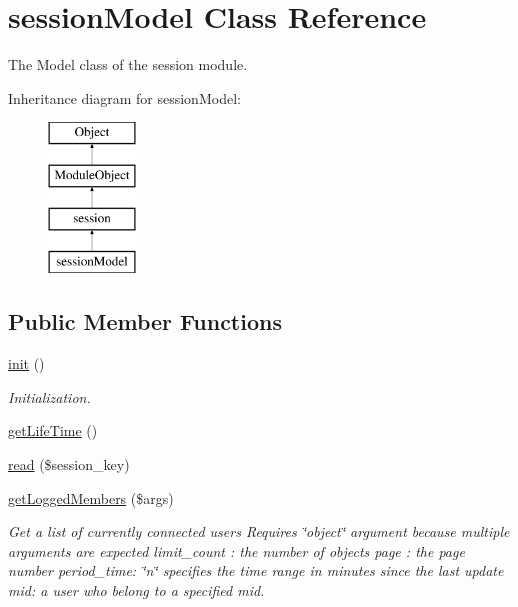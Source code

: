 \hypertarget{classsessionModel}{}\section{session\+Model Class Reference}
\label{classsessionModel}


The Model class of the session module.  


Inheritance diagram for session\+Model\+:\begin{figure}[H]
\begin{center}
\leavevmode
\includegraphics[height=4.000000cm]{classsessionModel}
\end{center}
\end{figure}
\subsection*{Public Member Functions}
\begin{DoxyCompactItemize}
\item 
\hyperlink{classsessionModel_a860d5067061beadd0bc15d57df695dd8}{init} ()
\begin{DoxyCompactList}\small\item\em Initialization. \end{DoxyCompactList}\item 
\hyperlink{classsessionModel_a3c6de96ddf005e54fd486754acb4c28a}{get\+Life\+Time} ()
\item 
\hyperlink{classsessionModel_a1cae587d88bb84dc32c1c7b751b11528}{read} (\$session\+\_\+key)
\item 
\hyperlink{classsessionModel_ab6fda0dcadba97f36ceb3be8c207cadc}{get\+Logged\+Members} (\$args)
\begin{DoxyCompactList}\small\item\em Get a list of currently connected users Requires \char`\"{}object\char`\"{} argument because multiple arguments are expected limit\+\_\+count \+: the number of objects page \+: the page number period\+\_\+time\+: \char`\"{}n\char`\"{} specifies the time range in minutes since the last update mid\+: a user who belong to a specified mid. \end{DoxyCompactList}\end{DoxyCompactItemize}
